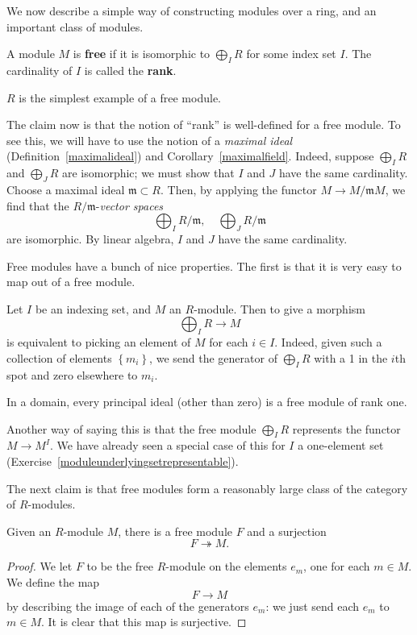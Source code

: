 We now describe a simple way of constructing modules over a ring, and an
important class of modules.

\begin{definition} 
A module $M$ is \textbf{free} if it is isomorphic to $\bigoplus_I R$ for some
index set $I$. The cardinality of $I$ is called the \textbf{rank}.
\end{definition} 

\begin{example} 
$R$ is the simplest example of a free module.
\end{example} 

The claim now is that the notion of ``rank'' is well-defined for a free
module. To see this, we will have to use the notion 
of a \emph{maximal ideal} (Definition~\ref{maximalideal}) and
Corollary~\ref{maximalfield}.
Indeed, suppose
$\bigoplus_I R$ and $\bigoplus_J R$ are isomorphic; we must show that $I$ and
$J$ have the same cardinality. Choose a maximal ideal $\mathfrak{m}
\subset R$. Then, by applying the functor $M \to
M/\mathfrak{m}M$, we find that the $R/\mathfrak{m}$-\emph{vector spaces}
\[ \bigoplus_I R/\mathfrak{m}, \quad \bigoplus_J R/\mathfrak{m}  \]
are isomorphic. By linear algebra, $I$ and $J$ have the same cardinality. 


Free modules have a bunch of nice properties. The first is that it is very
easy to map out of a free module.
\begin{example} 
Let $I$ be an indexing set, and $M$ an $R$-module. Then to give a morphism
\[ \bigoplus_I R \to M  \]
is equivalent to picking an element of $M$ for each $i \in I$. Indeed, given
such a collection of elements $\left\{m_i\right\}$, we send the generator of $\bigoplus_I R$ with a 1
in the $i$th spot and zero elsewhere to $m_i$.
\end{example}

\begin{example} 
In a domain, every principal ideal (other than zero) is a free module of rank
one.
\end{example} 

Another way of saying this is that the free module $\bigoplus_I R$ represents
the functor $M \to M^I$. We have already seen a special case of this for $I$ a
one-element set (Exercise~\ref{moduleunderlyingsetrepresentable}).

The next claim is that free modules form a reasonably large class of the
category of $R$-modules.

\begin{proposition} 
Given an $R$-module $M$, there is a free module $F$ and a surjection
\[ F \twoheadrightarrow M.  \]
\end{proposition} 
\begin{proof} 
We let $F$ to be the free $R$-module on the elements $e_m$, one for each $m
\in M$. We define the map
\[ F \to M  \]
by describing the image of each of the generators $e_m$: we just send each
$e_m$ to $m \in M$. It is clear that this map is surjective.
\end{proof} 

